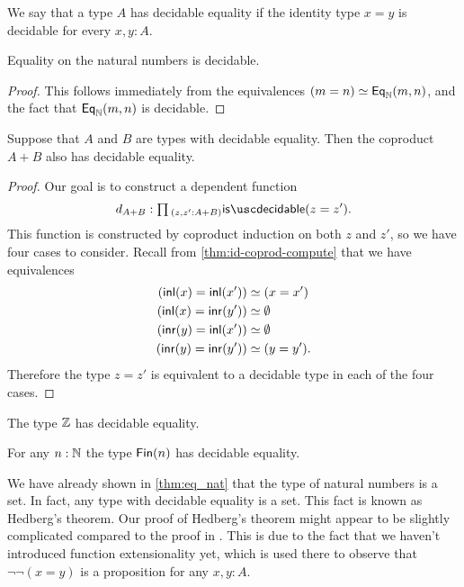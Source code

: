 \begin{defn}
  We say that a type $A$ has decidable equality if the identity type $x=y$ is decidable for every $x,y:A$. 
\end{defn}

\begin{cor}
  Equality on the natural numbers is decidable.
\end{cor}

\begin{proof}
  This follows immediately from the equivalences $(m=n)\simeq \mathsf{Eq}_{{\mathbb{N}}}(m,n)$, and the fact that $\mathsf{Eq}_{{\mathbb{N}}}(m,n)$ is decidable.
\end{proof}

\begin{lem}
  Suppose that $A$ and $B$ are types with decidable equality. Then the coproduct $A+B$ also has decidable equality.
\end{lem}

\begin{proof}
  Our goal is to construct a dependent function
  \begin{equation*}
    d_{A+B} : \prd{z,z':A+B}\isdecidable(z=z').
  \end{equation*}
  This function is constructed by coproduct induction on both $z$ and $z'$, so we have four cases to consider. Recall from \cref{thm:id-coprod-compute} that we have equivalences
  \begin{align*}
    ({\mathsf{inl}}(x)={\mathsf{inl}}(x')) & \simeq (x=x') \\
    ({\mathsf{inl}}(x)={\mathsf{inr}}(y')) & \simeq \emptyset \\
    ({\mathsf{inr}}(y)={\mathsf{inl}}(x')) & \simeq \emptyset \\
    ({\mathsf{inr}}(y)={\mathsf{inr}}(y')) & \simeq (y=y').
  \end{align*}
  Therefore the type $z=z'$ is equivalent to a decidable type in each of the four cases.
\end{proof}

\begin{cor}
  The type ${\mathbb{Z}}$ has decidable equality.
\end{cor}

\begin{cor}
  For any $n:{\mathbb{N}}$ the type $\mathsf{Fin}(n)$ has decidable equality. 
\end{cor}

We have already shown in \cref{thm:eq_nat} that the type of natural numbers is a set. In fact, any type with decidable equality is a set. This fact is known as Hedberg's theorem. Our proof of Hedberg's theorem might appear to be slightly complicated compared to the proof in \cite{hottbook}. This is due to the fact that we haven't introduced function extensionality yet, which is used there to observe that $\neg\neg(x=y)$ is a proposition for any $x,y:A$.

